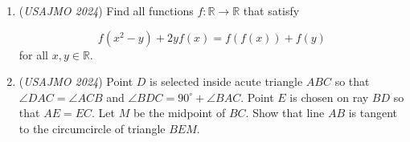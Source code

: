 \begin{enumerate}
 

	\item (\textit{USAJMO 2024}) Find all functions $f:\mathbb{R}\rightarrow\mathbb{R}$ that satisfy

 \[f(x^2-y)+2yf(x)=f(f(x))+f(y)\]
for all $x,y\in\mathbb{R}$.


 

	\item (\textit{USAJMO 2024}) Point $D$ is selected inside acute triangle $ABC$ so that $\angle DAC=\angle ACB$ and $\angle BDC=90^\circ+\angle BAC$. Point $E$ is chosen on ray $BD$ so that $AE=EC$. Let $M$ be the midpoint of $BC$. Show that line $AB$ is tangent to the circumcircle of triangle $BEM$.


 

\end{enumerate}